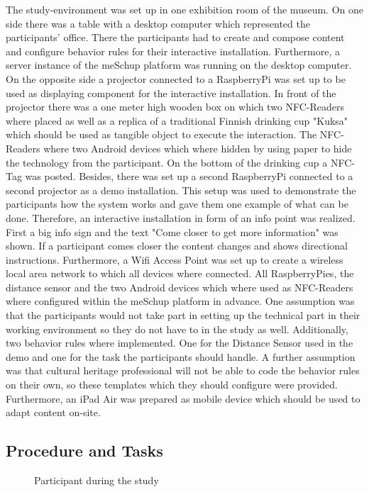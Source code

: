 The study-environment was set up in one exhibition room of the museum. On one side there was a table with a desktop computer which represented the participants' office. There the participants had to create and compose content and configure behavior rules for their interactive installation. Furthermore, a server instance of the meSchup platform was running on the desktop computer. On the opposite side a projector connected to a RaspberryPi was set up to be used as displaying component for the interactive installation. In front of the projector there was a one meter high wooden box on which two NFC-Readers where placed as well as a replica of a traditional Finnish drinking cup "Kuksa" which should be used as tangible object to execute the interaction. The NFC-Readers where two Android devices which where hidden by using paper to hide the technology from the participant. On the bottom of the drinking cup a NFC-Tag was posted. Besides, there was set up a second RaspberryPi connected to a second projector as a demo installation. This setup was used to demonstrate the participants how the system works and gave them one example of what can be done. Therefore, an interactive installation in form of an info point was realized. First a big info sign and the text "Come closer to get more information" was shown. If a participant comes closer the content changes and shows directional instructions. Furthermore, a Wifi Access Point was set up to create a wireless local area network to which all devices where connected. All RaspberryPies, the distance sensor and the two Android devices which where used as NFC-Readers where configured within the meSchup platform in advance. One assumption was that the participants would not take part in setting up the technical part in their working environment so they do not have to in the study as well. Additionally, two behavior rules where implemented. One for the Distance Sensor used in the demo and one for the task the participants should handle. A further assumption was that cultural heritage professional will not be able to code the behavior rules on their own, so these templates which they should configure were provided. Furthermore, an iPad Air was prepared as mobile device which should be used to adapt content on-site.

\subsection{Procedure and Tasks}

\begin{figure}
\hfill
{}\hfill
  \hfill
\caption{Participant during the study}
\end{figure}

